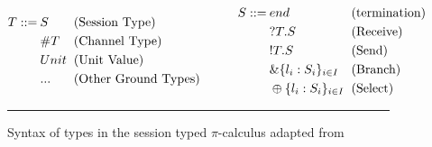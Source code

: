 \begin{figure}[ht]
    \centering
    \begin{align*}
            \begin{split}
                T ::= \: & S \hspace{2mm} \\
                & \#T\hspace{2mm}\\
                & Unit \hspace{2mm}\\
                & ... \hspace{2mm}\\
            \end{split}
            &
            \begin{split}
                & \text{(Session Type)}\hspace{7mm}\\
                & \text{(Channel Type)}\hspace{7mm}\\
                & \text{(Unit Value)}\hspace{7mm}\\
                & \text{(Other Ground Types)}\hspace{7mm}\\
            \end{split}
            &
            \begin{split}
                S ::= \: & end \hspace{2mm}\\
                & ?T.S \hspace{2mm}\\
                & !T.S \hspace{2mm}\\
                & \& \{l_i : S_i\}_{i \in I} \hspace{2mm}\\
                & \oplus\{l_i : S_i\}_{i \in I} \hspace{2mm}\\
            \end{split}
            &
            \begin{split}
                & \text{(termination)} \\
                & \text{(Receive)} \\
                & \text{(Send)} \\
                & \text{(Branch)} \\
                & \text{(Select)} \\
            \end{split}
    \end{align*}
    \noindent\rule{12cm}{0.8pt}

    \caption{Syntax of types in the session typed $\pi$-calculus adapted from \citep{dardha2017session}}
    \label{fig:typeSyntax}
\end{figure}

